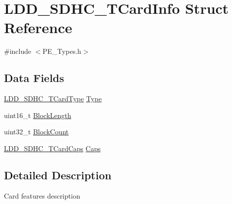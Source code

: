 \hypertarget{struct_l_d_d___s_d_h_c___t_card_info}{\section{L\-D\-D\-\_\-\-S\-D\-H\-C\-\_\-\-T\-Card\-Info Struct Reference}
\label{struct_l_d_d___s_d_h_c___t_card_info}
}


{\ttfamily \#include $<$P\-E\-\_\-\-Types.\-h$>$}

\subsection*{Data Fields}
\begin{DoxyCompactItemize}
\item 
\hyperlink{group___p_e___types__module_ga5344ded013ca3da273ed4f52c9c96fc7}{L\-D\-D\-\_\-\-S\-D\-H\-C\-\_\-\-T\-Card\-Type} \hyperlink{struct_l_d_d___s_d_h_c___t_card_info_ab2b86f6fe821778459edd351d08eb4bd}{Type}
\item 
uint16\-\_\-t \hyperlink{struct_l_d_d___s_d_h_c___t_card_info_a46cbdea4ece83eeaa17410e9763cc3a9}{Block\-Length}
\item 
uint32\-\_\-t \hyperlink{struct_l_d_d___s_d_h_c___t_card_info_aaf0587f4fc0e52a160d0ac2a1106c4e9}{Block\-Count}
\item 
\hyperlink{struct_l_d_d___s_d_h_c___t_card_caps}{L\-D\-D\-\_\-\-S\-D\-H\-C\-\_\-\-T\-Card\-Caps} \hyperlink{struct_l_d_d___s_d_h_c___t_card_info_a591c22d1aa49944325b35c63d2bf8199}{Caps}
\end{DoxyCompactItemize}


\subsection{Detailed Description}
Card features description 

